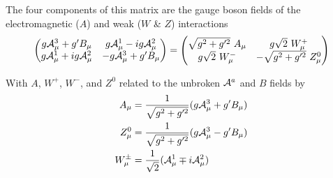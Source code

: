        The four components of this matrix are the gauge boson fields of the electromagnetic ($A$) and weak ($W$ \& $Z$) interactions
        \begin{equation} \begin{split}
            \begin{pmatrix} 
                g\wField^3_{\mu} + g'B_{\mu} & g\wField^1_{\mu} - ig\wField^2_{\mu} \\
                g\wField^1_{\mu} + ig\wField^2_{\mu} & -g\wField^3_{\mu} + g'B_{\mu}
            \end{pmatrix} =
            \begin{pmatrix} 
                \sqrt{g^2 + g^{\prime 2}}\ A_{\mu} & g \sqrt{2}\ W^+_{\mu} \\
                g \sqrt{2}\ W^-_{\mu} & - \sqrt{g^2 + g^{\prime 2}}\ Z^0_{\mu}
            \end{pmatrix}
        \end{split} \end{equation}

        With $A$, $W^+$, $W^-$, and $Z^0$ related to the unbroken $\mathcal{A}^a$ and $B$ fields by
        \begin{equation} \begin{split}
            A_{\mu} & = \frac{1}{\sqrt{g^2 + g^{\prime 2}}} ( g\mathcal{A}^3_{\mu} + g'B_{\mu} ) \\
            Z^0_{\mu} & = \frac{1}{\sqrt{g^2 + g^{\prime 2}}} ( g\mathcal{A}^3_{\mu} - g'B_{\mu} ) \\
            W^{\pm}_{\mu} & = \frac{1}{\sqrt{2}} (\mathcal{A}^1_{\mu} \mp i\mathcal{A}^2_{\mu})
        \end{split} \end{equation}

